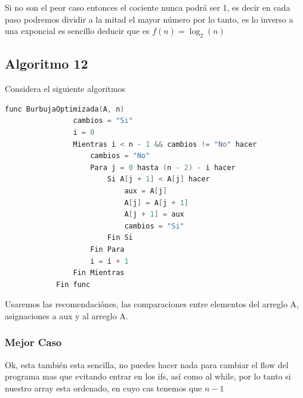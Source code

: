 \documentclass[12pt, fleqn]{article}                            %
\theoremstyle{break}                                            %
\begin{document}
            Si no son el peor caso entonces el cociente nunca podrá ser 1, es decir en cada paso podremos
            dividir a la mitad el mayor número por lo tanto, es lo inverso a una exponcial es sencillo deducir
            que es $f(n) = \log_2(n)$



    \clearpage
    \subsection{Algoritmo 12}

        Considera el siguiente algoritmos
        \begin{lstlisting}[language=C, gobble=12, basicstyle=\small\color{white}]
            func BurbujaOptimizada(A, n)
                cambios = "Si"
                i = 0
                Mientras i < n - 1 && cambios != "No" hacer 
                    cambios = "No"
                    Para j = 0 hasta (n - 2) - i hacer
                        Si A[j + 1] < A[j] hacer    
                            aux = A[j]
                            A[j] = A[j + 1]
                            A[j + 1] = aux
                            cambios = "Si"
                        Fin Si             
                    Fin Para
                    i = i + 1
                Fin Mientras
            Fin func
        \end{lstlisting}

        Usaremos las recomendaciónes, las comparaciones entre elementos del arreglo A, asignaciones
        a aux y al arreglo A.

        \subsubsection{Mejor Caso}

            Ok, esta también esta sencilla, no puedes hacer nada para cambiar el flow del programa
            mas que evitando entrar en los ifs, así como al while, por lo tanto si nuestro array
            esta ordenado, en cuyo cas tenemos que $n - 1$


\end{document}
